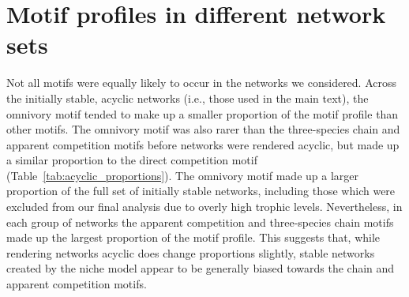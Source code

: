 \documentclass[12pt]{article}
\begin{document}
\begin{spacing}{2.0}
\clearpage
    

    \subsection*{}

\section{Motif profiles in different network sets}

    Not all motifs were equally likely to occur in the networks we considered. 
    Across the initially stable, acyclic networks (i.e., those used in the main text), the omnivory motif tended to make up a smaller proportion of the motif profile than other motifs.
    The omnivory motif was also rarer than the three-species chain and apparent competition motifs before networks were rendered acyclic, but made up a similar proportion to the direct competition motif (Table~\ref{tab:acyclic_proportions}).
    The omnivory motif made up a larger proportion of the full set of initially stable networks, including those which were excluded from our final analysis due to overly high trophic levels.
    Nevertheless, in each group of networks the apparent competition and three-species chain motifs made up the largest proportion of the motif profile.
    This suggests that, while rendering networks acyclic does change proportions slightly, stable networks created by the niche model appear to be generally biased towards the chain and apparent competition motifs.
    

\end{spacing}
\end{document}
